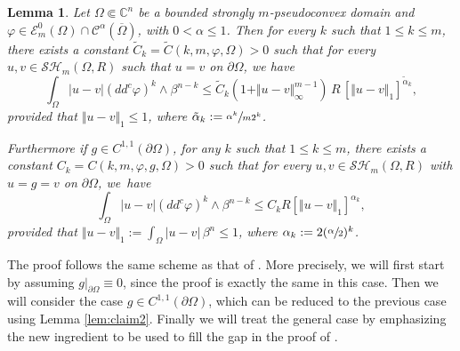 \documentclass[JEP,XML,SOM,Unicode]{cedram}
\newtheorem{lemma}[theorem]{Lemma}
\theoremstyle{definition}
\newcommand{\C}{\mathbb{C}}
\begin{document}
\begin{lemma}\label{lem:ModC} Let $\Omega \Subset \C^n$ be a bounded strongly $m$-pseudoconvex domain and $\varphi\in \mathcal{E}^0_m (\Omega)\cap \mathcal{C}^{\alpha} (\overline\Omega)$, with $ 0 < \alpha \leq 1$. Then for every $k$ such that $1 \leq k \leq m$, there exists a constant $\tilde C_k = \tilde C (k,m,\varphi, \Omega) >0$ such that for every $u,v\in \mathcal{SH}_m (\Omega,R)$ such that $u = v$ on $\partial \Omega$, we have
\begin{equation} \label{eq:MocEst2}
\int_{\Omega}|u-v| (dd^c\varphi)^k\wedge\beta^{n-k}\leq \tilde C_k (1 + \Vert u - v\Vert_{\infty}^{m-1}) \, R \, \left[\Vert u-v \Vert_1\right]^{\tilde \alpha_k },
\end{equation}
provided that $\Vert u-v \Vert_1 \leq 1$, where $\tilde \alpha_k := \sfrac{\alpha^k}{m 2^k} $.

Furthermore if $g \in C^{1,1} (\partial \Omega)$, for any $k$ such that $1 \leq k\leq m$, there exists a constant $C_k = C (k,m, \varphi,g,\Omega) > 0$ such that for every $u, v \in \mathcal{SH}_m (\Omega,R)$ with $u = g = v$ on $\partial \Omega$, we~have
\begin{equation} \label{eq:MocEst1}
\int_{\Omega}|u-v|(dd^c\varphi)^k\wedge\beta^{n-k}\leq C_k R \left[\Vert u-v \Vert_1\right]^{\alpha_k},
\end{equation}
provided that $\Vert u-v \Vert_1 := \int_{\Omega} \vert u - v\vert \, \beta^n \leq 1$, where $\alpha_k := 2 (\sfrac{\alpha}{ 2})^k$.
\end{lemma}

The proof follows the same scheme as that of \cite[Lem.\,4.2]{BZ20}. More precisely,
we will first start by assuming $g|_{\partial \Omega} \equiv 0$, since the proof is exactly the same in this case.
Then we will consider the case $g\in C^{1,1} (\partial \Omega)$, which can be reduced to the previous case using Lemma \ref{lem:claim2}.
Finally we will treat the general case by emphasizing the new ingredient to be used to fill the gap in the proof of \cite[Lem.\,4.2]{BZ20}.
\end{document}
